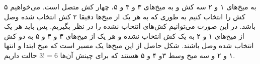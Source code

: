 \p
به میخ‌های ۱ و ۲ سه کش و به میخ‌های ۳ و ۴ و ۵، چهار کش متصل است. می‌خواهیم ۵ کش را انتخاب کنیم به طوری که به هر یک از میخ‌ها دقیقا ۲ کش انتخاب شده وصل باشد. در این صورت می‌توانیم کش‌های انتخاب نشده را در نظر بگیریم. 
پس باید هر یک از میخ‌های ۱ و ۲ به یک کش انتخاب نشده و هر یک از میخ‌های ۳ و ۴ و ۵ به دو کش انتخاب شده وصل باشند.
شکل حاصل از این میخ‌ها یک مسیر است که میخ ابتدا و انتها ۱ و ۲ و سه میخ وسط ۳و ۴ و ۵ هستند که برای چینش آن‌ها
$3! = 6$
حالت داریم.
